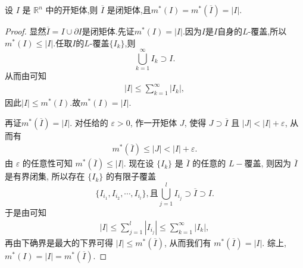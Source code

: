 \documentclass[../../main.tex]{subfiles}%
\begin{document}
\begin{proposition}
设 \(I\) 是 \(\mathbb{R}^n\) 中的开矩体,则  \(\overline{I}\) 是闭矩体,且\(m^*(I) = m^*(\overline{I}) = |I|\). 
\end{proposition}
\begin{proof}

显然$\overline{I}=I\cup \partial I$是闭矩体.先证$m^*(I)=|I|$.因为$I$是$I$自身的$L$-覆盖,所以$m^*(I)\leqslant |I|$.任取$I$的$L$-覆盖$\{I_k\}$,则
\[
\bigcup_{k = 1}^{\infty} I_{k} \supset I.
\]
从而由可知
\begin{align*}
|I| \leqslant \sum_{k = 1}^{\infty} |I_k|,
\end{align*}
因此\(|I| \leqslant m^*(I)\).故$m^*(I)=|I|.$

再证$m^*(\overline{I})=|I|$.
对任给的 \(\varepsilon > 0\), 作一开矩体 \(J\), 使得 \(J \supset \overline{I}\) 且 \(|J| < |I| + \varepsilon\), 从而有
\begin{align*}
m^*(\overline{I}) \leqslant  |J| < |I| + \varepsilon.
\end{align*}
由 \(\varepsilon\) 的任意性可知 \(m^*(\overline{I}) \leqslant  |I|\). 现在设 \(\{I_k\}\) 是 \(\overline{I}\) 的任意的 \(L -\)覆盖, 则因为 \(\overline{I}\) 是有界闭集, 所以存在 \(\{I_k\}\) 的有限子覆盖
\[
\{I_{i_1}, I_{i_2}, \cdots, I_{i_l}\},\text{且}\bigcup_{j = 1}^l I_{i_j} \supset \overline{I}\supset I.
\]
于是由可知
\begin{align*}
|I| \leqslant  \sum_{j = 1}^l |I_{i_j}| \leqslant  \sum_{k = 1}^{\infty} |I_k|,
\end{align*}
再由下确界是最大的下界可得 \(|I| \leqslant  m^*(\overline{I})\), 从而我们有 \(m^*(\overline{I}) = |I|\). 
综上,$m^*(I)=|I|=m^*(\overline{I})$.

\end{proof}
\end{document}
